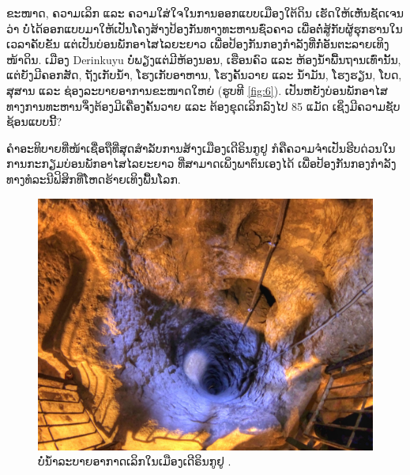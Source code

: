 \documentclass[10pt,twocolumn,letterpaper]{article}
\begin{document}
ຂະໜາດ, ຄວາມເລິກ ແລະ ຄວາມໃສ່ໃຈໃນການອອກແບບເມືອງໃຕ້ດິນ ເຮັດໃຫ້ເຫັນຊັດເຈນວ່າ ບໍ່ໄດ້ອອກແບບມາໃຫ້ເປັນໂຄງສ້າງປ້ອງກັນທາງທະຫານຊົ່ວຄາວ ເພື່ອຕໍ່ສູ້ກັບຜູ້ຮຸກຮານໃນເວລາຄັບຂັນ ແຕ່ເປັນບ່ອນພັກອາໄສໄລຍະຍາວ ເພື່ອປ້ອງກັນກອງກຳລັງທີ່ກໍ່ອັນຕະລາຍເທິງໜ້າດິນ. ເມືອງ Derinkuyu ບໍ່ພຽງແຕ່ມີຫ້ອງນອນ, ເຮືອນຄົວ ແລະ ຫ້ອງນ້ຳພື້ນຖານເທົ່ານັ້ນ, ແຕ່ຍັງມີຄອກສັດ, ຖັງເກັບນ້ຳ, ໂຮງເກັບອາຫານ, ໂຮງຄັ້ນວາຍ ແລະ ນ້ຳມັນ, ໂຮງຮຽນ, ໂບດ, ສຸສານ ແລະ ຊ່ອງລະບາຍອາການຂະໜາດໃຫຍ່ (ຮູບທີ \ref{fig:6}). ເປັນຫຍັງບ່ອນພັກອາໄສທາງການທະຫານຈຶ່ງຕ້ອງມີເຄື່ອງຄັ້ນວາຍ ແລະ ຕ້ອງຂຸດເລິກລົງໄປ 85 ແມັດ ເຊິ່ງມີຄວາມຊັບຊ້ອນແບບນີ້?

ຄຳອະທິບາຍທີ່ໜ້າເຊື່ອຖືທີ່ສຸດສຳລັບການສ້າງເມືອງເດີຣິນກູຢູ ກໍຄືຄວາມຈຳເປັນຮີບດ່ວນໃນການກະກຽມບ່ອນພັກອາໄສໄລຍະຍາວ ທີ່ສາມາດເພິ່ງພາຕົນເອງໄດ້ ເພື່ອປ້ອງກັນກອງກຳລັງທາງທໍລະນີຟິສິກທີ່ໂຫດຮ້າຍເທິງພື້ນໂລກ.

\begin{figure}[t]
\begin{center}
   \includegraphics[width=1\linewidth]{derinkuyu-air.jpg}
\end{center}
   \caption{ບໍ່ນ້ຳລະບາຍອາກາດເລິກໃນເມືອງເດີຣິນກູຢູ \cite{53}.}
\label{fig:6}
\label{fig:onecol}
\end{figure}


\end{document}
